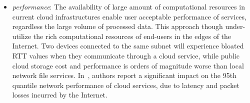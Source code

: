 \begin{itemize}
\item {\it performance}: The availability of large amount of computational
      resources in current cloud infrastructures enable user acceptable
      performance of services, regardless the large volume of processed data.
      This approach though under-utilize the rich computational resources of
      end-users in the edges of the Internet.  Two devices connected to the
      same subnet will experience bloated RTT values when they communicate
      through a cloud service, while public cloud storage cost and performance
      is orders of magnitude worse than local network file services.
      In~\cite{Wittie2010}, authors report a significant impact on the 95th
      quantile network performance of cloud services, due to latency and packet
      losses incurred by the Internet. 


\end{itemize}
